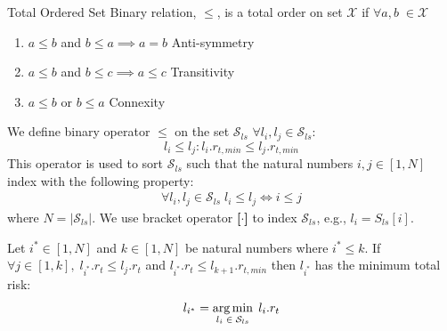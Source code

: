 \begin{definition}{Total Ordered Set}\label{def:total_order}
Binary relation, $\le$, is a total order on set $\mathcal{X}$ if $\forall a,b \; \in \mathcal{X}$
\begin{enumerate}
    \item $a \le b$ and $b \le a \implies a = b$ \quad Anti-symmetry
    \item $a \le b$ and $b \le c \implies a \le c$ \quad Transitivity
    \item $a \le b$ or $b \le a$  \quad Connexity
\end{enumerate}
\end{definition}
We define binary operator $\le$ on the set $\mathcal{S}_{ls}$  $\forall l_i,l_j \in \mathcal{S}_{ls}$:
\begin{equation}
    l_{i} \le l_{j} : l_{i}.r_{t,min} \le l_{j}.r_{t,min}
\end{equation}
This operator is used to sort $\mathcal{S}_{ls}$ such that the natural numbers $i,j \in [1, N]$ index with the following property:
\begin{align}
   \forall l_i, l_j \in \mathcal{S}_{ls} \; l_i \le l_j \iff i \le j
\end{align}
where $N = |\mathcal{S}_{ls}|$. We use bracket operator \textbf{[$\cdot$]} to index $\mathcal{S}_{ls}$, e.g., $l_i = {S}_{ls}[i]$.

\begin{theorem}\label{thm:ch5_thm1}
Let $i^{*} \in [1, N]$ and $k \in [1, N]$ be natural numbers where $i^* \le k$.  If $\forall j \in [1, k],\; l_{i^{*}}.r_{t} \le l_j.r_{t}$ and  $l_{i^{*}}.r_{t} \le l_{k+1}.r_{t,min}$  then $l_{i^{*}}$ has the minimum total risk: 
\begin{equation}
    l_{i^{*}} = \operatorname*{arg\,min}_{l_i \; \in \; \mathcal{S}_{ls}} \; l_i.r_{t}
\end{equation}

\end{theorem}

